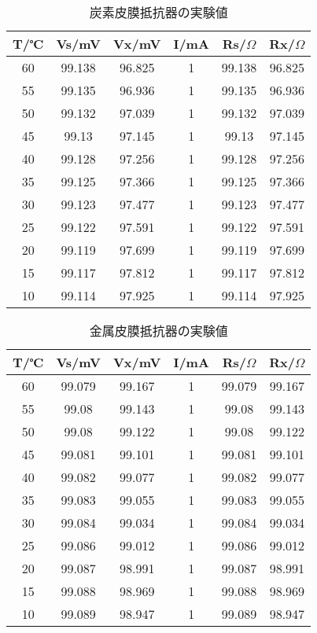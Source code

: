 \documentclass[11pt,a4j]{jsarticle}
\begin{document}
 \begin{table}[htb]
  \begin{center}
    \caption{炭素皮膜抵抗器の実験値}
    \begin{tabular}{cccccc} \toprule
T/℃	&	Vs/mV	&	Vx/mV	&	I/mA	&	Rs/$\Omega$	&	Rx/$\Omega$\\ \midrule
60	&	99.138	&	96.825	&	1	&	99.138	&	96.825\\
55	&	99.135	&	96.936	&	1	&	99.135	&	96.936\\
50	&	99.132	&	97.039	&	1	&	99.132	&	97.039\\
45	&	99.13	&	97.145	&	1	&	99.13	&	97.145\\
40	&	99.128	&	97.256	&	1	&	99.128	&	97.256\\
35	&	99.125	&	97.366	&	1	&	99.125	&	97.366\\
30	&	99.123	&	97.477	&	1	&	99.123	&	97.477\\
25	&	99.122	&	97.591	&	1	&	99.122	&	97.591\\
20	&	99.119	&	97.699	&	1	&	99.119	&	97.699\\
15	&	99.117	&	97.812	&	1	&	99.117	&	97.812\\
10	&	99.114	&	97.925	&	1	&	99.114	&	97.925\\ \bottomrule
    \end{tabular}
    \label{tab:price}
  \end{center}
\end{table}

 \begin{table}[htb]
  \begin{center}
    \caption{金属皮膜抵抗器の実験値}
    \begin{tabular}{cccccc} \toprule
T/℃	&	Vs/mV	&	Vx/mV	&	I/mA	&	Rs/$\Omega$	&	Rx/$\Omega$\\ \midrule
60	&	99.079	&	99.167	&	1	&	99.079	&	99.167\\
55	&	99.08	&	99.143	&	1	&	99.08	&	99.143\\
50	&	99.08	&	99.122	&	1	&	99.08	&	99.122\\
45	&	99.081	&	99.101	&	1	&	99.081	&	99.101\\
40	&	99.082	&	99.077	&	1	&	99.082	&	99.077\\
35	&	99.083	&	99.055	&	1	&	99.083	&	99.055\\
30	&	99.084	&	99.034	&	1	&	99.084	&	99.034\\
25	&	99.086	&	99.012	&	1	&	99.086	&	99.012\\
20	&	99.087	&	98.991	&	1	&	99.087	&	98.991\\
15	&	99.088	&	98.969	&	1	&	99.088	&	98.969\\
10	&	99.089	&	98.947	&	1	&	99.089	&	98.947\\ \bottomrule
    \end{tabular}
    \label{tab:price}
  \end{center}
\end{table}
\end{document}
